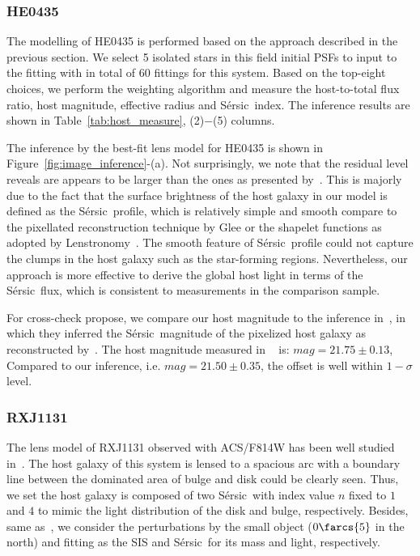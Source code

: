 \documentclass[fleqn,usenatbib]{mnras}
\newcommand{\sersic}{S\'ersic}
\newcommand{\lenstronomy}{{\sc Lenstronomy}}
\begin{document}
\subsubsection{HE0435}
The modelling of HE0435 is performed based on the approach described in the previous section. We select 5 isolated stars in this field initial PSFs to input to the fitting with in total of 60 fittings for this system. Based on the top-eight choices, we perform the weighting algorithm and measure the host-to-total flux ratio, host magnitude, effective radius and \sersic\ index. The inference results are shown in Table~\ref{tab:host_measure}, (2)$-$(5) columns.

The inference by the best-fit lens model for HE0435 is shown in Figure~\ref{fig:image_inference}-(a). Not surprisingly, we note that the residual level reveals are appears to be larger than the ones as presented by~\citet{Wong2017}. This is majorly due to the fact that the surface brightness of the host galaxy in our model is defined as the \sersic\ profile, which is relatively simple and smooth compare to the pixellated reconstruction technique by {\sc Glee} or the shapelet functions as adopted by \lenstronomy~\citep{Refregier2003, Birrer2015}. The smooth feature of \sersic\ profile could not capture the clumps in the host galaxy such as the star-forming regions. Nevertheless, our approach is more effective to derive the global host light in terms of the \sersic\ flux, which is consistent to measurements in the comparison sample. 

For cross-check propose, we compare our host magnitude to the inference in~\citet{Ding2017b}, in which they inferred the \sersic\ magnitude of the pixelized host galaxy as reconstructed by~\citet{Wong2017}. The host magnitude measured in ~\citet{Ding2017b} is: $mag = 21.75 \pm 0.13$, %
Compared to our inference, i.e. $mag = 21.50 \pm 0.35$, the offset is well within $1-\sigma$ level.

\subsubsection{RXJ1131}
The lens model of RXJ1131 observed with ACS/F814W has been well studied in~\citet{Suyu2013}. The host galaxy of this system is lensed to a spacious arc with a boundary line between the dominated area of bulge and disk could be clearly seen. Thus, we set the host galaxy is composed of two \sersic\ with index value $n$ fixed to $1$ and $4$ to mimic the light distribution of the disk and bulge, respectively. Besides, same as~\citet{Suyu2013}, we consider the perturbations by the small object ($0\farcs{5}$ in the north) and fitting as the SIS and \sersic\ for its mass and light, respectively.
\end{document}
